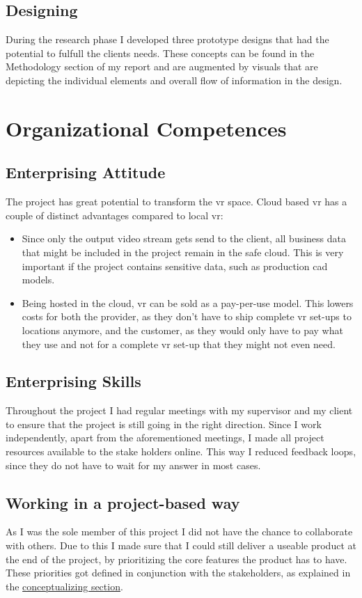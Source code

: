 \documentclass[]{article}
\begin{document}
\subsection{Designing}
During the research phase I developed three prototype designs that had the potential to fulfull the clients needs. These concepts can be found in the Methodology section of my report and are augmented by visuals that are depicting the individual elements and overall flow of information in the design.

\section{Organizational Competences}
\subsection{Enterprising Attitude}
The project has great potential to transform the \acrshort{vr} space. Cloud based \acrshort{vr} has a couple of distinct advantages compared to local \acrshort{vr}:
\begin{itemize}
  \item Since only the output video stream gets send to the client, all business data that might be included in the project remain in the safe cloud. This is very important if the project contains sensitive data, such as production \acrshort{cad} models.
  \item Being hosted in the cloud, \acrshort{vr} can be sold as a pay-per-use model. This lowers costs for both the provider, as they don't have to ship complete \acrshort{vr} set-ups to locations anymore, and the customer, as they would only have to pay what they use and not for a complete \acrshort{vr} set-up that they might not even need.
\end{itemize}

\subsection{Enterprising Skills}
Throughout the project I had regular meetings with my supervisor and my client to ensure that the project is still going in the right direction. Since I work independently, apart from the aforementioned meetings, I made all project resources available to the stake holders online. This way I reduced feedback loops, since they do not have to wait for my answer in most cases.

\subsection{Working in a project-based way}
As I was the sole member of this project I did not have the chance to collaborate with others. Due to this I made sure that I could still deliver a useable product at the end of the project, by prioritizing the core features the product has to have. These priorities got defined in conjunction with the stakeholders, as explained in the \hyperref[sec:conc]{conceptualizing section}.
\end{document}
